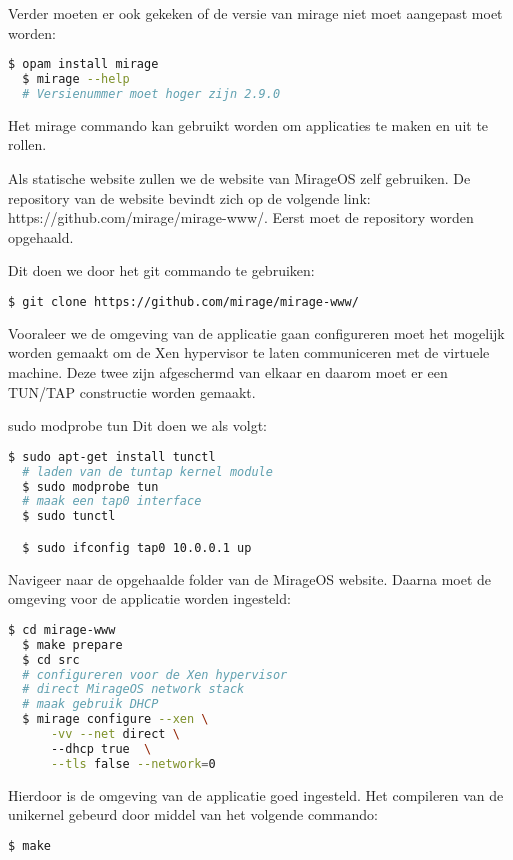 \noindent Verder moeten er ook gekeken of de versie van mirage niet moet aangepast moet worden:
\begin{lstlisting}[language=bash]
  $ opam install mirage
  $ mirage --help
  # Versienummer moet hoger zijn 2.9.0
\end{lstlisting}

Het mirage commando kan gebruikt worden om applicaties te maken en uit te rollen.

Als statische website zullen we de website van MirageOS zelf gebruiken. De repository van de website bevindt zich op de volgende link: https://github.com/mirage/mirage-www/. Eerst moet de repository worden opgehaald. 

\noindent Dit doen we door het git commando te gebruiken:
\begin{lstlisting}[language=bash]
  $ git clone https://github.com/mirage/mirage-www/
\end{lstlisting}

Vooraleer we de omgeving van de applicatie gaan configureren moet het mogelijk worden gemaakt om de Xen hypervisor te laten communiceren met de virtuele machine. Deze twee zijn afgeschermd van elkaar en daarom moet er een TUN/TAP constructie worden gemaakt. 

sudo modprobe tun
\noindent Dit doen we als volgt:
\begin{lstlisting}[language=bash]
  $ sudo apt-get install tunctl
  # laden van de tuntap kernel module
  $ sudo modprobe tun 
  # maak een tap0 interface
  $ sudo tunctl 

  $ sudo ifconfig tap0 10.0.0.1 up 
\end{lstlisting}

Navigeer naar de opgehaalde folder van de MirageOS website. 
\noindent Daarna moet de omgeving voor de applicatie worden ingesteld:
\begin{lstlisting}[language=bash]
  $ cd mirage-www
  $ make prepare
  $ cd src
  # configureren voor de Xen hypervisor
  # direct MirageOS network stack
  # maak gebruik DHCP
  $ mirage configure --xen \
      -vv --net direct \ 
      --dhcp true  \
      --tls false --network=0
\end{lstlisting}

Hierdoor is de omgeving van de applicatie goed ingesteld.
\noindent Het compileren van de unikernel gebeurd door middel van het volgende commando:
\begin{lstlisting}[language=bash]
  $ make
\end{lstlisting}

